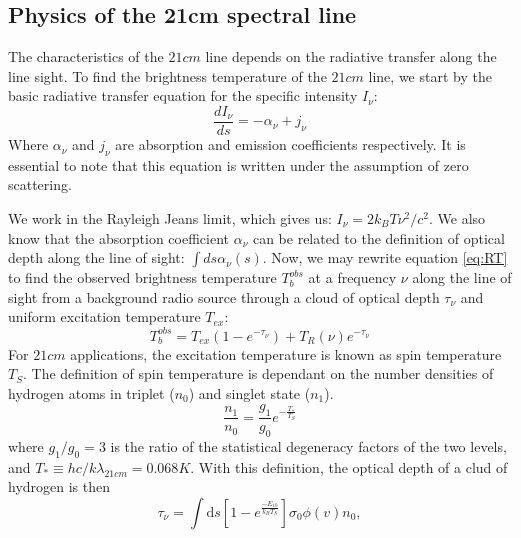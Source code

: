 \documentclass[12pt, TexShade, letterpaper]{report}
\begin{document}
\subsection{Physics of the 21cm spectral line}
The characteristics of the $21cm$ line depends on the radiative transfer along the line sight. To find the brightness temperature of the $21cm$ line, we start by the basic radiative transfer equation for the specific intensity $I_{\nu}$:
\begin{equation}
    \frac{dI_\nu}{ds} = - \alpha_\nu + j_\nu
    \label{eq:RT}
\end{equation}
Where $\alpha_\nu$ and $j_\nu$ are absorption and emission coefficients respectively. It is essential to note that this equation is written under the assumption of zero scattering. \par
We work in the Rayleigh Jeans limit, which gives us: $I_\nu = 2k_B T \nu^2 /c^2$. We also know that the absorption coefficient $\alpha_\nu$ can be related to the definition of optical depth along the line of sight: $\int ds \alpha_\nu \left(s\right)$. Now, we may rewrite equation \ref{eq:RT} to find the observed brightness temperature $T^{obs}_b$ at a frequency $\nu$ along the line of sight from a background radio source through a cloud of optical depth $\tau_\nu$ and uniform excitation temperature $T_{ex}$:
\begin{equation}
    T^{obs}_b = T_{ex} \left(1-e^{-\tau_\nu} \right) + T_R \left (\nu \right) e ^{-\tau_\nu}
\end{equation}
For $21cm$ applications, the excitation temperature is known as spin temperature $T_S$. The definition of spin temperature is dependant on the number densities of hydrogen atoms in triplet ($n_0$) and singlet state ($n_1$).
\begin{equation}
    \frac{n_1}{n_0} = \frac{g_1}{g_0} e ^ {-\frac{T_*}{T_S}}
\end{equation}
where $g_1/g_0 = 3$ is the ratio of the statistical degeneracy factors of the two levels, and $T_* \equiv hc/k\lambda_{21cm} = 0.068 K$. With this definition, the optical depth of a clud of hydrogen is then 
\begin{equation}
    \tau_\nu=\int \mathrm{d} s\left[1- e^{ \frac {-E_{10}}{ k_B T_S}}\right] \sigma_0 \phi(v) n_0,
\end{equation}
\end{document}
